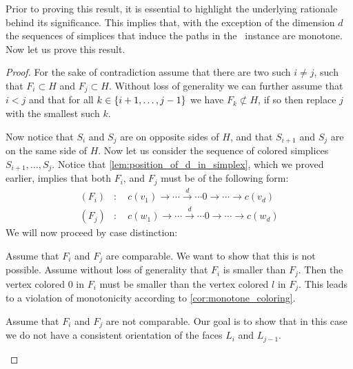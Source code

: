 Prior to proving this result, it is essential to highlight the underlying rationale behind its significance. This implies that, with the exception of the dimension $d$ the sequences of simplices that induce the paths in the \EndOfLine\ instance are monotone. Now let us prove this result.
\begin{proof}
	For the sake of contradiction assume that there are two such $i \neq j$, such that $F_i \subset H$ and $F_j \subset H$. Without loss of generality we can further assume that $i < j$ and that for all $k \in \left\{i+1, \dots, j-1\right\}$ we have $F_k \not\subset H$, if so then replace $j$ with the smallest such $k$.\par
	Now notice that $S_i$ and $S_{j}$ are on opposite sides of $H$, and that $S_{i+1}$ and $S_{j}$ are on the same side of $H$. Now let us consider the sequence of colored simplices $S_{i+1}, \dots, S_j$. Notice that \cref{lem:position_of_d_in_simplex}, which we proved earlier, implies that both $F_i$, and $F_j$ must be of the following form:
	\begin{align*}
		(F_i) & : \quad c(v_1) \xrightarrow{}  \cdots \xrightarrow{d} \cdots  0 \xrightarrow{} \cdots \xrightarrow{} c(v_d) \\
		(F_j) & : \quad c(w_1) \xrightarrow{}  \cdots \xrightarrow{d} \cdots  0 \xrightarrow{} \cdots \xrightarrow{} c(w_d)
	\end{align*}
	We will now proceed by case distinction:
	\begin{case}{1}
		Assume that $F_i$ and $F_j$ are comparable. We want to show that this is not possible. Assume without loss of generality that $F_i$ is smaller than $F_j$. Then the vertex colored $0$ in $F_i$ must be smaller than the vertex colored $l$ in $F_j$. This leads to a violation of monotonicity according to \cref{cor:monotone_coloring}.
	\end{case}
	\begin{case}{2}
		Assume that $F_i$ and $F_j$ are not comparable. Our goal is to show that in this case we do not have a consistent orientation of the faces $L_i$ and $L_{j-1}$.
	\end{case}
\end{proof}